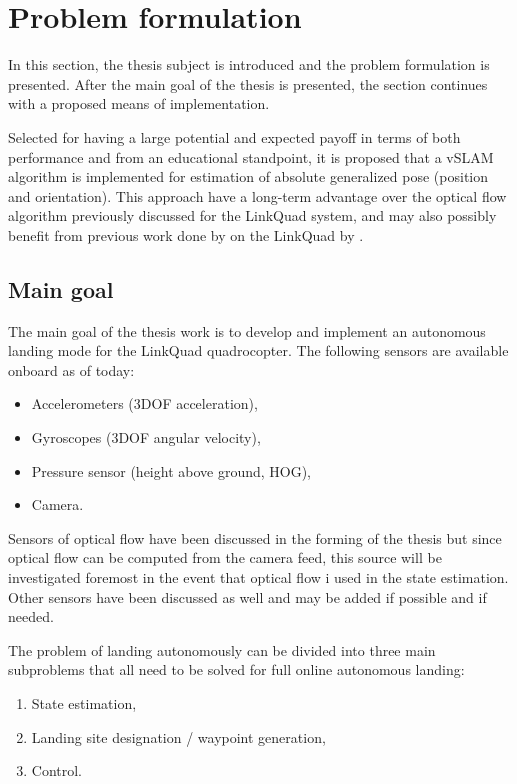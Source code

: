 \section{Problem formulation}
\label{sec:problemformulation}
    In this section, the thesis subject is introduced and the problem
    formulation is presented. After the main goal of the thesis is presented, 
    the section continues with a proposed means of implementation.

    Selected for having a large potential and expected payoff in terms of
    both performance and from an educational standpoint, it is proposed
    that a vSLAM algorithm is implemented for estimation of absolute
    generalized pose (position and orientation).
    This approach have a long-term advantage over the optical flow
    algorithm previously discussed for the LinkQuad system, and may also possibly benefit from
    previous work done by on the LinkQuad by \citep{Barac11}.
    
    \subsection{Main goal}
        The main goal of the thesis work is to develop and implement
        an autonomous landing mode for the LinkQuad quadrocopter.
        The following sensors are available onboard as of today:
        \begin{itemize}
            \item Accelerometers (3DOF acceleration),
            \item Gyroscopes (3DOF angular velocity),
            \item Pressure sensor (height above ground, HOG),
            \item Camera.
        \end{itemize}

        Sensors of optical flow have been discussed in the forming of the
        thesis but since optical flow can be computed from the camera feed,
        this source will be investigated foremost in the event that optical flow
        i used in the state estimation. Other sensors have been discussed
        as well and may be added if possible and if needed.

        The problem of landing autonomously can be divided into three main
        subproblems that all need to be solved for full online autonomous landing:
        \begin{enumerate}
            \item State estimation,
            \item Landing site designation / waypoint generation,
            \item Control.
        \end{enumerate}

